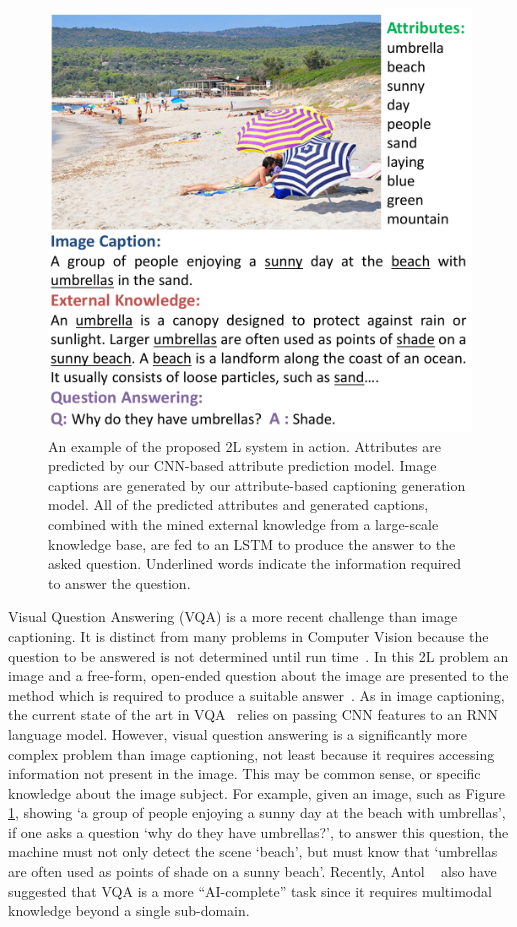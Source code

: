 \begin{figure}[t!]
\centering
  \includegraphics[width=0.9\linewidth]{./img/titile_example_fig_real.pdf}
  \vspace{-5pt}
  \caption{
    An example of the proposed \V2L system in action. Attributes are predicted by our CNN-based attribute prediction model.
    Image captions are generated by our attribute-based captioning generation model.
    All of the predicted attributes and generated captions, combined with the mined external knowledge
    from a large-scale knowledge base, are fed to an LSTM to produce the answer to the asked question.
    Underlined words indicate the information required to answer the question.}
  \label{img:example}
  \vspace{-15pt}
\end{figure}


Visual Question Answering (VQA) is a more recent challenge than image captioning. It is distinct from many problems in Computer Vision because the question to be answered is not determined until run time~\cite{antol2015vqa}. %
In this \V2L problem an image and a free-form, open-ended question about the image are presented to the method which is required to produce a suitable answer~\cite{antol2015vqa}. As in image captioning,
 the current state of the art in VQA~\cite{gao2015you,malinowski2015ask,ren2015image}
 relies on passing CNN features to an RNN language model.
 However, visual question answering is a significantly more complex problem than image captioning, not least because it requires accessing information not present in the image.  This may be common sense, or specific knowledge about the image subject. For example, given an image, such as Figure \ref{img:example}, showing `a group of people enjoying a sunny day at the beach with umbrellas', if one asks a question `why do they have umbrellas?', to answer this question, the machine must not only detect the scene `beach', but must know that `umbrellas are often used as points of shade on a sunny beach'. Recently, Antol \etal~\cite{antol2015vqa} also have suggested that VQA is a more ``AI-complete'' task since it requires multimodal knowledge beyond a single sub-domain. %

